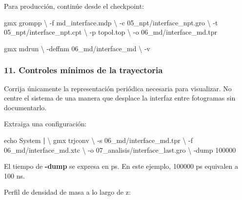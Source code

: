 \documentclass[
  spanish,
  11pt,
  a4paper]{article}
\newenvironment{Shaded}{\begin{snugshade}}{\end{snugshade}}
\newcommand{\AttributeTok}[1]{\textcolor[rgb]{0.13,0.29,0.53}{#1}}
\newcommand{\BuiltInTok}[1]{#1}
\newcommand{\DataTypeTok}[1]{\textcolor[rgb]{0.13,0.29,0.53}{#1}}
\newcommand{\ExtensionTok}[1]{#1}
\newcommand{\KeywordTok}[1]{\textcolor[rgb]{0.13,0.29,0.53}{\textbf{#1}}}
\newcommand{\NormalTok}[1]{#1}
\begin{document}
Para producción, continúe desde el checkpoint:

\begin{Shaded}
\begin{Highlighting}[]
\ExtensionTok{gmx}\NormalTok{ grompp }\DataTypeTok{\textbackslash{}}
    \AttributeTok{{-}f}\NormalTok{ md\_interface.mdp }\DataTypeTok{\textbackslash{}}
    \AttributeTok{{-}c}\NormalTok{ 05\_npt/interface\_npt.gro }\DataTypeTok{\textbackslash{}}
    \AttributeTok{{-}t}\NormalTok{ 05\_npt/interface\_npt.cpt }\DataTypeTok{\textbackslash{}}
    \AttributeTok{{-}p}\NormalTok{ topol.top }\DataTypeTok{\textbackslash{}}
    \AttributeTok{{-}o}\NormalTok{ 06\_md/interface\_md.tpr}

\ExtensionTok{gmx}\NormalTok{ mdrun }\DataTypeTok{\textbackslash{}}
    \AttributeTok{{-}deffnm}\NormalTok{ 06\_md/interface\_md }\DataTypeTok{\textbackslash{}}
    \AttributeTok{{-}v}
\end{Highlighting}
\end{Shaded}

\subsubsection{11. Controles mínimos de la
trayectoria}\label{controles-muxednimos-de-la-trayectoria}

Corrija únicamente la representación periódica necesaria para
visualizar. No centre el sistema de una manera que desplace la interfaz
entre fotogramas sin documentarlo.

Extraiga una configuración:

\begin{Shaded}
\begin{Highlighting}[]
\BuiltInTok{echo}\NormalTok{ System }\KeywordTok{|} \DataTypeTok{\textbackslash{}}
\ExtensionTok{gmx}\NormalTok{ trjconv }\DataTypeTok{\textbackslash{}}
    \AttributeTok{{-}s}\NormalTok{ 06\_md/interface\_md.tpr }\DataTypeTok{\textbackslash{}}
    \AttributeTok{{-}f}\NormalTok{ 06\_md/interface\_md.xtc }\DataTypeTok{\textbackslash{}}
    \AttributeTok{{-}o}\NormalTok{ 07\_analisis/interface\_last.gro }\DataTypeTok{\textbackslash{}}
    \AttributeTok{{-}dump}\NormalTok{ 100000}
\end{Highlighting}
\end{Shaded}

El tiempo de \textbf{-dump} se expresa en ps. En este ejemplo, 100000 ps
equivalen a 100 ns.

Perfil de densidad de masa a lo largo de z:
\end{document}
